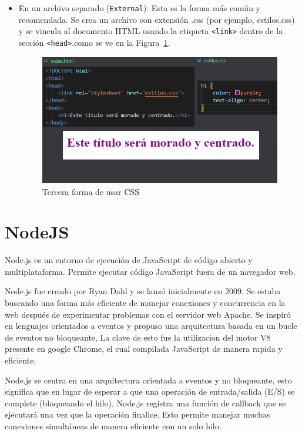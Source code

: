 \documentclass[a4paper, 12pt]{book}
\let\cleardoublepage\clearpage
\begin{document}
\begin{itemize}
\item En un archivo separado (\texttt{External}): Esta es la forma más común y recomendada. Se crea un archivo con extensión .css (por ejemplo, estilos.css) y se vincula al documento HTML usando la etiqueta \texttt{<link>} dentro de la sección \texttt{<head>}.como se ve en la Figura~\ref{fig:Style_External}.
\begin{figure}[H]
    \centering
    \includegraphics[width=0.8\linewidth]{img/Style3.png}
    \caption{Tercera forma de usar CSS}
    \label{fig:Style_External}
\end{figure}


\end{itemize}
\cleardoublepage

\section{NodeJS} 
\label{sec:seccion9}

Node.js es un entorno de ejecución de JavaScript de código abierto y multiplataforma. Permite ejecutar código JavaScript fuera de un navegador web.

Node.js fue creado por Ryan Dahl y se lanzó inicialmente en 2009. Se estaba buscando una forma más eficiente de manejar conexiones y concurrencia en la web después de experimentar problemas con el servidor web Apache. Se inspiró en lenguajes orientados a eventos y propuso una arquitectura basada en un bucle de eventos no bloqueante, La clave de esto fue la utilizacion del motor V8 presente en google Chrome, el cual compilada JavaScript de manera rapida y eficiente.

Node.js se centra en una arquitectura orientada a eventos y no bloqueante, esto significa que en lugar de esperar a que una operación de entrada/salida (E/S) se complete (bloqueando el hilo), Node.js registra una función de callback que se ejecutará una vez que la operación finalice. Esto permite manejar muchas conexiones simultáneas de manera eficiente con un solo hilo. 
\end{document}
